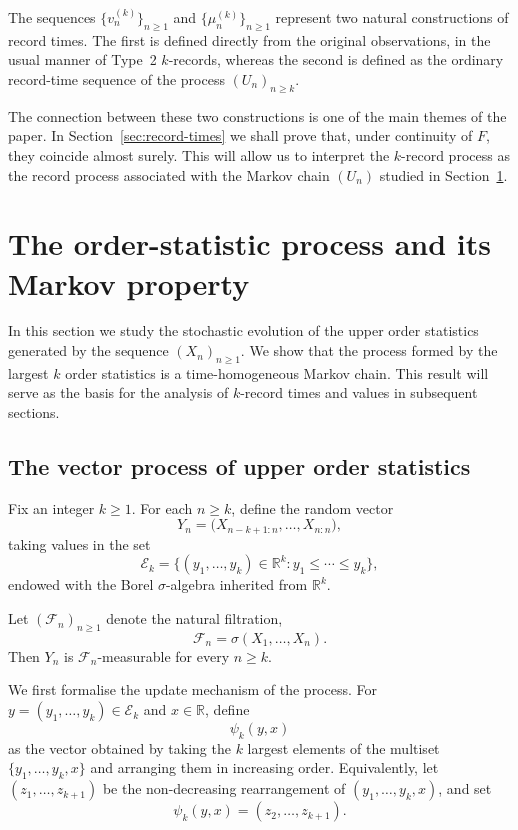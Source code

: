 \documentclass[12pt]{article}
\theoremstyle{definition}
\begin{document}
The sequences $\{v_n^{(k)}\}_{n\ge1}$ and $\{\mu_n^{(k)}\}_{n\ge1}$ represent two natural constructions of record times. The first is defined directly from the original observations, in the usual manner of Type~2 $k$-records, whereas the second is defined as the ordinary record-time sequence of the process $(U_n)_{n\ge k}$.

The connection between these two constructions is one of the main themes of the paper. In Section~\ref{sec:record-times} we shall prove that, under continuity of $F$, they coincide almost surely. This will allow us to interpret the $k$-record process as the record process associated with the Markov chain $(U_n)$ studied in Section~\ref{sec:markov-order-statistics}.


\section{The order-statistic process and its Markov property}
\label{sec:markov-order-statistics}

In this section we study the stochastic evolution of the upper order statistics generated by the sequence $(X_n)_{n\ge1}$. We show that the process formed by the largest $k$ order statistics is a time-homogeneous Markov chain. This result will serve as the basis for the analysis of $k$-record times and values in subsequent sections.

\subsection{The vector process of upper order statistics}
\label{subsec:vector-process}

Fix an integer $k\ge1$. For each $n\ge k$, define the random vector
\[
Y_n = \bigl(X_{n-k+1:n},\dots,X_{n:n}\bigr),
\]
taking values in the set
\[
\mathcal{E}_k
=
\{(y_1,\dots,y_k)\in\mathbb{R}^k : y_1 \le \cdots \le y_k\},
\]
endowed with the Borel $\sigma$-algebra inherited from $\mathbb{R}^k$.

Let $(\mathcal{F}_n)_{n\ge1}$ denote the natural filtration,
\[
\mathcal{F}_n = \sigma(X_1,\dots,X_n).
\]
Then $Y_n$ is $\mathcal{F}_n$-measurable for every $n\ge k$.

\medskip

We first formalise the update mechanism of the process. For $y=(y_1,\dots,y_k)\in\mathcal{E}_k$ and $x\in\mathbb{R}$, define
\[
\psi_k(y,x)
\]
as the vector obtained by taking the $k$ largest elements of the multiset $\{y_1,\dots,y_k,x\}$ and arranging them in increasing order. Equivalently, let $(z_1,\dots,z_{k+1})$ be the non-decreasing rearrangement of $(y_1,\dots,y_k,x)$, and set
\[
\psi_k(y,x) = (z_2,\dots,z_{k+1}).
\]
\end{document}
